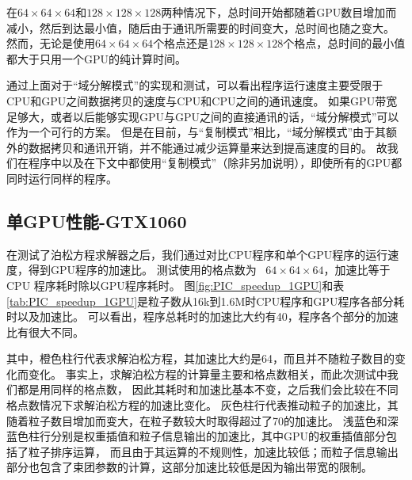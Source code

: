 在$64 \times 64 \times 64$和$128 \times 128 \times 128$两种情况下，总时间开始都随着GPU数目增加而减小，然后到达最小值，随后由于通讯所需要的时间变大，总时间也随之变大。
然而，无论是使用$64 \times 64 \times 64$个格点还是$128 \times 128 \times 128$个格点，总时间的最小值都大于只用一个GPU的纯计算时间。

通过上面对于“域分解模式”的实现和测试，可以看出程序运行速度主要受限于CPU和GPU之间数据拷贝的速度与CPU和CPU之间的通讯速度。
如果GPU带宽足够大，或者以后能够实现GPU与GPU之间的直接通讯的话，“域分解模式”可以作为一个可行的方案。
但是在目前，与“复制模式”相比，“域分解模式”由于其额外的数据拷贝和通讯开销，并不能通过减少运算量来达到提高速度的目的。
故我们在程序中以及在下文中都使用“复制模式”（除非另加说明），即使所有的GPU都同时运行同样的程序。

\subsection{单GPU性能-GTX1060}      \label{section:PIC_Performance_GTX1060}
在测试了泊松方程求解器之后，我们通过对比CPU程序和单个GPU程序的运行速度，得到GPU程序的加速比。
测试使用的格点数为~ $64 \times 64 \times 64$，加速比等于 CPU 程序耗时除以GPU程序耗时。
图\eqref{fig:PIC_speedup_1GPU}和表\eqref{tab:PIC_speedup_1GPU}是粒子数从16k到1.6M时CPU程序和GPU程序各部分耗时以及加速比。
可以看出，程序总耗时的加速比大约有40，程序各个部分的加速比有很大不同。

其中，橙色柱行代表求解泊松方程，其加速比大约是64，而且并不随粒子数目的变化而变化。
事实上，求解泊松方程的计算量主要和格点数相关，而此次测试中我们都是用同样的格点数，
因此其耗时和加速比基本不变，之后我们会比较在不同格点数情况下求解泊松方程的加速比变化。
灰色柱行代表推动粒子的加速比，其随着粒子数目增加而变大，在粒子数较大时取得超过了70的加速比。
浅蓝色和深蓝色柱行分别是权重插值和粒子信息输出的加速比，其中GPU的权重插值部分包括了粒子排序运算，
而且由于其运算的不规则性，加速比较低；而粒子信息输出部分也包含了束团参数的计算，这部分加速比较低是因为输出带宽的限制。


